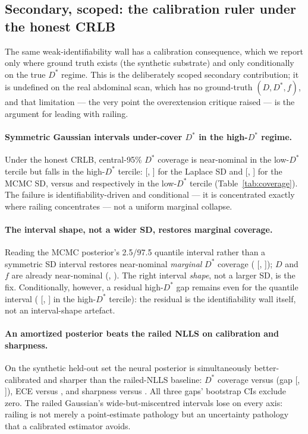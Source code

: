 \documentclass[11pt]{article}
\renewcommand{\d}{D}                 %
\newcommand{\Ds}{D^{*}}
\begin{document}
\subsection{Secondary, scoped: the calibration ruler under the honest CRLB}
\label{sec:ruler}

The same weak-identifiability wall has a calibration consequence, which we report
only where ground truth exists (the synthetic substrate) and only conditionally on
the true $\Ds$ regime. This is the deliberately scoped secondary contribution; it
is undefined on the real abdominal scan, which has no ground-truth $(\d,\Ds,f)$,
and that limitation --- the very point the overextension critique raised --- is
the argument for leading with railing.

\paragraph{Symmetric Gaussian intervals under-cover $\Ds$ in the high-$\Ds$
regime.} Under the honest CRLB, central-95\% $\Ds$ coverage is near-nominal in the
low-$\Ds$ tercile but falls in the high-$\Ds$ tercile: \covLapHonHigh{}
[\covLapHonHighLo, \covLapHonHighHi] for the Laplace SD and \covMcHonHigh{}
[\covMcHonHighLo, \covMcHonHighHi] for the MCMC SD, versus \covLapHonLow{} and
\covMcHonLow{} respectively in the low-$\Ds$ tercile (Table~\ref{tab:coverage}).
The failure is identifiability-driven and conditional --- it is concentrated
exactly where railing concentrates --- not a uniform marginal collapse.

\paragraph{The interval shape, not a wider SD, restores marginal coverage.}
Reading the MCMC posterior's 2.5/97.5 quantile interval rather than a symmetric SD
interval restores near-nominal \emph{marginal} $\Ds$ coverage (\margMqDstar{}
[\margMqDstarLo, \margMqDstarHi]); $\d$ and $f$ are already near-nominal
(\margMqD, \margMqF). The right interval \emph{shape}, not a larger SD, is the fix.
Conditionally, however, a residual high-$\Ds$ gap remains even for the quantile
interval (\covMqHonHigh{} [\covMqHonHighLo, \covMqHonHighHi] in the high-$\Ds$
tercile): the residual is the identifiability wall itself, not an interval-shape
artefact.

\paragraph{An amortized posterior beats the railed NLLS on calibration and
sharpness.} On the synthetic held-out set the neural posterior is simultaneously
better-calibrated and sharper than the railed-NLLS baseline: $\Ds$ coverage
\flowCov{} versus \nllsCov{} (gap \gapCov{} [\gapCovLo, \gapCovHi]), ECE \flowEce{}
versus \nllsEce, and sharpness \flowSharp{} versus \nllsSharp. All three gaps'
bootstrap CIs exclude zero. The railed Gaussian's wide-but-miscentred intervals
lose on every axis: railing is not merely a point-estimate pathology but an
uncertainty pathology that a calibrated estimator avoids.
\end{document}
